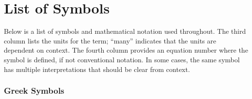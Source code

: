 \chapter*{List of Symbols}

Below is a list of symbols and mathematical notation used throughout. The third column lists the units for the term; ``many'' indicates that the units are dependent on context. The fourth column provides an equation number where the symbol is defined, if not conventional notation. In some cases, the same symbol has multiple interpretations that should be clear from context.

\subsection*{Greek Symbols}
